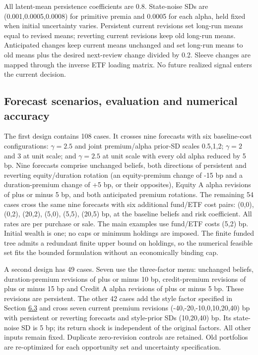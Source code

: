 \documentclass[11pt]{article}
\begin{document}
All latent-mean persistence coefficients are 0.8. State-noise SDs are (0.001,0.0005,0.0008) for primitive premia and 0.0005 for each alpha, held fixed when initial uncertainty varies. Persistent current revisions set long-run means equal to revised means; reverting current revisions keep old long-run means. Anticipated changes keep current means unchanged and set long-run means to old means plus the desired next-review change divided by 0.2. Sleeve changes are mapped through the inverse ETF loading matrix. No future realized signal enters the current decision.

\subsection{Forecast scenarios, evaluation and numerical accuracy}\label{sec:C.2}

The first design contains 108 cases. It crosses nine forecasts with six baseline-cost configurations: \(\gamma=2.5\) and joint premium/alpha prior-SD scales 0.5,1,2; \(\gamma=2\) and \(3\) at unit scale; and \(\gamma=2.5\) at unit scale with every old alpha reduced by 5 bp. Nine forecasts comprise unchanged beliefs, both directions of persistent and reverting equity/duration rotation (an equity-premium change of -15 bp and a duration-premium change of +5 bp, or their opposites), Equity A alpha revisions of plus or minus 5 bp, and both anticipated premium rotations. The remaining 54 cases cross the same nine forecasts with six additional fund/ETF cost pairs: (0,0), (0,2), (20,2), (5,0), (5,5), (20,5) bp, at the baseline beliefs and risk coefficient. All rates are per purchase or sale. The main examples use fund/ETF costs (5,2) bp. Initial wealth is one; no caps or minimum holdings are imposed. The finite funded tree admits a redundant finite upper bound on holdings, so the numerical feasible set fits the bounded formulation without an economically binding cap.

A second design has 49 cases. Seven use the three-factor menu: unchanged beliefs, duration-premium revisions of plus or minus 10 bp, credit-premium revisions of plus or minus 15 bp and Credit A alpha revisions of plus or minus 5 bp. These revisions are persistent. The other 42 cases add the style factor specified in Section \hyperref[sec:6.3]{6.3} and cross seven current premium revisions (-40,-20,-10,0,10,20,40) bp with persistent or reverting forecasts and style-prior SDs (10,20,40) bp. Its state-noise SD is 5 bp; its return shock is independent of the original factors. All other inputs remain fixed. Duplicate zero-revision controls are retained. Old portfolios are re-optimized for each opportunity set and uncertainty specification.
\end{document}
